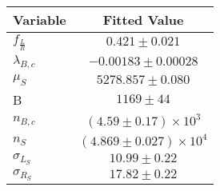 \begin{tabular}[t]{lc}
\hline
Variable &Fitted Value\\
\hline\hline
$f_{\frac{L}{R}}$&$0.421\pm0.021$\\
\hline
$\lambda_{B,c}$&$-0.00183\pm0.00028$\\
\hline
$\mu_S$&$5278.857\pm0.080$\\
\hline
B&$1169\pm44$\\
\hline
$n_{B,c}$&$(4.59\pm0.17)\times 10^3$\\
\hline
$n_S$&$(4.869\pm0.027)\times 10^4$\\
\hline
$\sigma_{L_S}$&$10.99\pm0.22$\\
\hline
$\sigma_{R_S}$&$17.82\pm0.22$\\
\hline
\end{tabular}